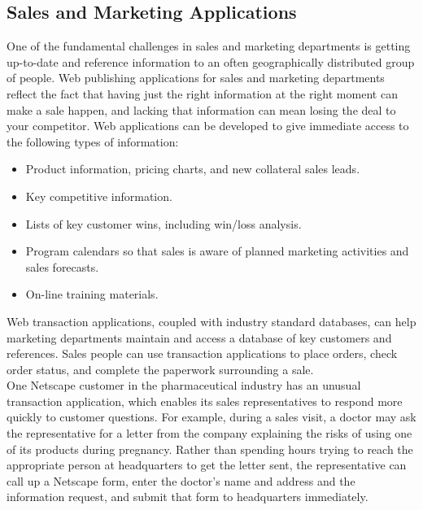 \subsection{Sales and Marketing Applications}

One of the fundamental challenges in sales and marketing departments is
getting up-to-date and reference information to an often geographically
distributed group of people. Web publishing applications for sales and
marketing departments reflect the fact that having just the right
information at the right moment can make a sale happen, and lacking
that information can mean losing the deal to your competitor. Web
applications can be developed to give immediate access to the following
types of information:
\begin{itemize}
  \item Product information, pricing charts, and new collateral sales
leads.
  \item Key competitive information.
  \item Lists of key customer wins, including win/loss analysis.
  \item Program calendars so that sales is aware of planned marketing
activities and sales forecasts.
  \item On-line training materials.
\end{itemize}

Web transaction applications, coupled with industry standard databases,
can help marketing departments maintain and access a database of key
customers and references. Sales people can use transaction applications
to place orders, check order status, and complete the paperwork
surrounding a sale.\\

One Netscape customer in the pharmaceutical industry has an unusual
transaction application, which enables its sales representatives to
respond more quickly to customer questions. For example, during a sales
visit, a doctor may ask the representative for a letter from the
company explaining the risks of using one of its products during
pregnancy. Rather than spending hours trying to reach the appropriate
person at headquarters to get the letter sent, the representative can
call up a Netscape form, enter the doctor's name and address and the
information request, and submit that form to headquarters immediately.\\

